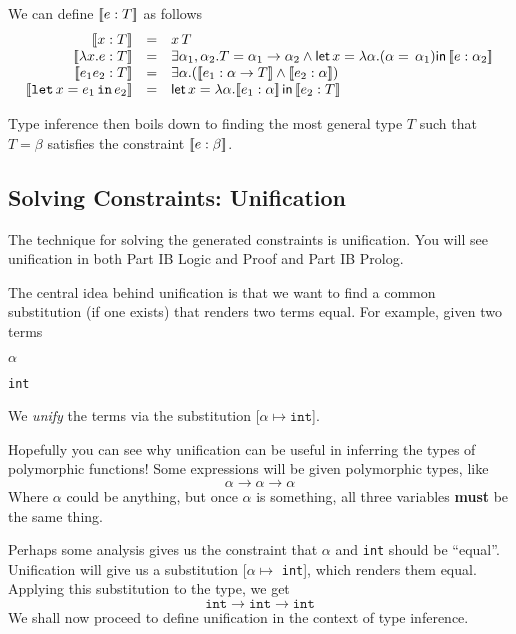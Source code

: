 {We can define $[\![e:T]\!]$ as follows
\[\begin{array}{rcl}
     \interpret{x:T}&=&x \, T  \\
     \interpret{\lambda x.e: T}&=&\exists \alpha_1, \alpha_2 . T = \alpha_1 \to \alpha_2 \land \textsf{let} \,  x = \lambda \alpha. (\alpha = \, \alpha_1) \textsf{in} \, \interpret{e: \alpha_2}\\
     \interpret{e_1 e_2: T} &=& \exists \alpha. (\interpret{e_1: \alpha \to T} \land \interpret{e_2: \alpha}) \\
     \interpret{\texttt{let}\, x = e_1 \, \texttt{in} \, e_2} &=& \textsf{let}\, x = \lambda \alpha. \interpret{e_1: \alpha} \, \textsf{in} \, \interpret{e_2: T}
\end{array}\]

Type inference then boils down to finding the most general type $T$ such that $T = \beta$ satisfies the constraint $[\![e: \beta]\!]$.

\subsection{Solving Constraints: Unification}
The technique for solving the generated constraints is unification. You will see unification in both \textsf{Part IB Logic and Proof} and \textsf{Part IB Prolog}.

The central idea behind unification is that we want to find a common substitution (if one exists) that renders two terms equal. For example, given two terms

\begin{center}
\begin{minipage}[t]{0.3\textwidth}
\centering
$\alpha$
\end{minipage}%
\begin{minipage}[t]{0.3\textwidth}
\centering
\texttt{int}
\end{minipage}
\end{center}

We \textit{unify} the terms via the substitution [$\alpha \mapsto \texttt{int}$]. 

Hopefully you can see why unification can be useful in inferring the types of polymorphic functions! Some expressions will be given polymorphic types, like 
\[\alpha \to \alpha \to \alpha\]
Where $\alpha$ could be anything, but once $\alpha$ is something, all three variables \textbf{must} be the same thing.

Perhaps some analysis gives us the constraint that $\alpha$ and \texttt{int} should be ``equal''. Unification will give us a substitution [$\alpha \mapsto$ \texttt{int}], which renders them equal. Applying this substitution to the type, we get
\[\texttt{int} \to \texttt{int} \to \texttt{int}\]
We shall now proceed to define unification in the context of type inference.

}
